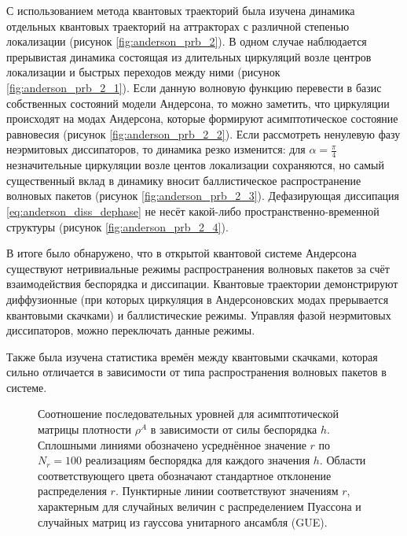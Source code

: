 С использованием метода квантовых траекторий была изучена динамика отдельных квантовых траекторий на аттракторах с различной степенью локализации (рисунок \cref{fig:anderson_prb_2}).
В одном случае наблюдается прерывистая динамика состоящая из длительных циркуляций возле центров локализации и быстрых переходов между ними (рисунок \cref{fig:anderson_prb_2_1}). 
Если данную волновую функцию перевести в базис собственных состояний модели Андерсона, то можно заметить, что циркуляции происходят на модах Андерсона, которые формируют асимптотическое состояние равновесия (рисунок \cref{fig:anderson_prb_2_2}). 
Если рассмотреть ненулевую фазу неэрмитовых диссипаторов, то динамика резко изменится: для \(\alpha=\frac{\pi}{4}\) незначительные циркуляции возле центов локализации сохраняются, но самый существенный вклад в динамику вносит баллистическое распространение волновых пакетов (рисунок \cref{fig:anderson_prb_2_3}). 
Дефазирующая диссипация \cref{eq:anderson_diss_dephase} не несёт какой-либо пространственно-временной структуры (рисунок \cref{fig:anderson_prb_2_4}).

В итоге было обнаружено, что в открытой квантовой системе Андерсона существуют нетривиальные режимы распространения волновых пакетов за счёт взаимодействия беспорядка и диссипации. Квантовые траектории демонстрируют диффузионные (при которых циркуляция в Андерсоновских модах прерывается квантовыми скачками) и баллистические режимы. Управляя фазой неэрмитовых диссипаторов, можно переключать данные режимы. 

Также была изучена статистика времён между квантовыми скачками, которая сильно отличается в зависимости от типа распространения волновых пакетов в системе.

\begin{figure}[h]
	\caption[Соотношение последовательных уровней для асимптотической матрицы плотности в зависимости от силы беспорядка в системе]{
		Соотношение последовательных уровней для асимптотической матрицы плотности \(\rho^A\) в зависимости от силы беспорядка \(h\). Сплошными линиями обозначено усреднённое значение \(r\) по \(N_r=100\) реализациям беспорядка для каждого значения \(h\). Области соответствующего цвета обозначают стандартное отклонение распределения \(r\). Пунктирные линии соответствуют значениям \(r\), характерным для случайных величин с распределением Пуассона и случайных матриц из гауссова унитарного ансамбля (GUE).
	}
	\label{fig:mbl_ratio}
\end{figure}

